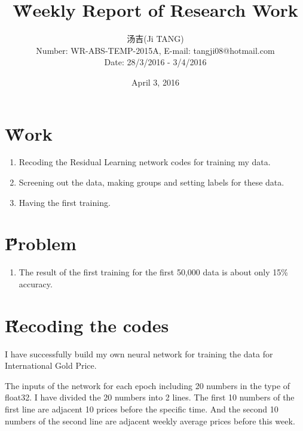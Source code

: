 \documentclass[12pt]{article}
\title{{\H Weekly Report of Research Work\\ }\quad {WR-ABS-TEMP-2015A-No.019}}
\author{汤吉(Ji TANG)\\
               Number: WR-ABS-TEMP-2015A,  E-mail: tangji08@hotmail.com \\
        Date: 28/3/2016 - 3/4/2016}
\date{April 3, 2016}
\begin{document}
  
\maketitle
\pagestyle{fancy}
\fancyhead[LO,RE]{\leftmark} %



\renewcommand{\headrulewidth}{0.4pt}
\renewcommand{\footrulewidth}{0.4pt}



\tableofcontents 
\newpage
\section{\H Work}
\begin{enumerate}
	\item Recoding the Residual Learning network codes for training my data.
	\item Screening out the data, making groups and setting labels for these data.
	\item Having the first training.
\end{enumerate}

\section{\H Problem}
\begin{enumerate}
	\item The result of the first training for the first 50,000 data is about only 15\% accuracy.
\end{enumerate}

\section{\H Recoding the codes}
I have successfully build my own neural network for training the data for International Gold Price. 

The inputs of the network for each epoch including 20 numbers in the type of float32. I have divided the 20 numbers into 2 lines. The first 10 numbers of the first line are adjacent 10 prices before the specific time. And the second 10 numbers of the second line are adjacent weekly average prices before this week.
\end{document}
